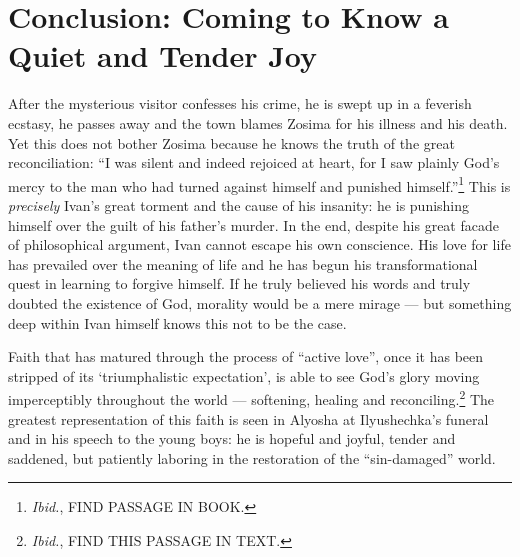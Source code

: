 \section{Conclusion: Coming to Know a Quiet and Tender Joy}
After the mysterious visitor confesses his crime, he is swept up in a feverish ecstasy, he passes away and the town blames Zosima for his illness and his death. Yet this does not bother Zosima because he knows the truth of the great reconciliation: ``I was silent and indeed rejoiced at heart, for I saw plainly God's mercy to the man who had turned against himself and punished himself.''\footnote{\emph{Ibid.}, FIND PASSAGE IN BOOK.} This is \emph{precisely} Ivan's great torment and the cause of his insanity: he is punishing himself over the guilt of his father's murder.  In the end, despite his great facade of philosophical argument, Ivan cannot escape his own conscience. His love for life has prevailed over the meaning of life and he has begun his transformational quest in learning to forgive himself. If he truly believed his words and truly doubted the existence of God, morality would be a mere mirage --- but something deep within Ivan himself knows this not to be the case.

Faith that has matured through the process of ``active love'', once it has been stripped of its `triumphalistic expectation', is able to see God's glory moving imperceptibly throughout the world --- softening, healing and reconciling.\footnote{\emph{Ibid.}, FIND THIS PASSAGE IN TEXT.} The greatest representation of this faith is seen in Alyosha at Ilyushechka's funeral and in his speech to the young boys: he is hopeful and joyful, tender and saddened, but patiently laboring in the restoration of the ``sin-damaged'' world.

\pagebreak
